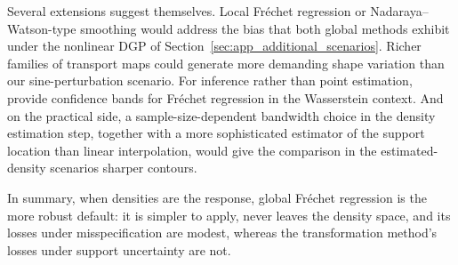 Several extensions suggest themselves. Local Fréchet regression or
Nadaraya--Watson-type smoothing would address the bias that both global methods
exhibit under the nonlinear DGP of Section~\ref{sec:app_additional_scenarios}.
Richer families of transport maps \parencite{PanaretosZemel2016} could generate more
demanding shape variation than our sine-perturbation scenario. For inference rather
than point estimation, \textcite{PetersenLiuDivani2021} provide confidence bands for
Fréchet regression in the Wasserstein context. And on the practical side, a
sample-size-dependent bandwidth choice in the density estimation step, together with
a more sophisticated estimator of the support location than linear interpolation,
would give the comparison in the estimated-density scenarios sharper contours.

In summary, when densities are the response, global Fréchet regression is the more
robust default: it is simpler to apply, never leaves the density space, and its
losses under misspecification are modest, whereas the transformation method's losses
under support uncertainty are not.
